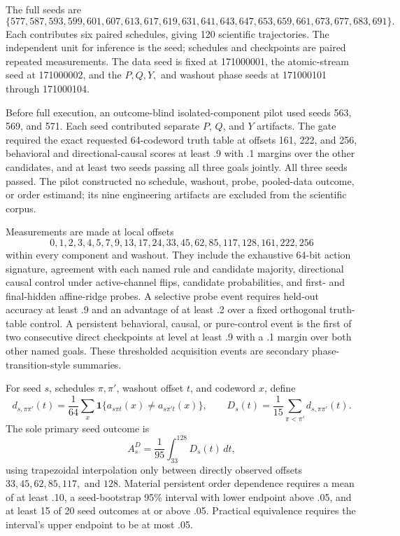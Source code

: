 \documentclass[11pt,a4paper]{article}
\begin{document}
The full seeds are
\[
\{577,587,593,599,601,607,613,617,619,631,
641,643,647,653,659,661,673,677,683,691\}.
\]
Each contributes six paired schedules, giving 120 scientific trajectories. The independent unit for inference is the seed; schedules and checkpoints are paired repeated measurements. The data seed is fixed at 171000001, the atomic-stream seed at 171000002, and the $P,Q,Y,$ and washout phase seeds at 171000101 through 171000104.

Before full execution, an outcome-blind isolated-component pilot used seeds 563, 569, and 571. Each seed contributed separate $P$, $Q$, and $Y$ artifacts. The gate required the exact requested 64-codeword truth table at offsets 161, 222, and 256, behavioral and directional-causal scores at least .9 with .1 margins over the other candidates, and at least two seeds passing all three goals jointly. All three seeds passed. The pilot constructed no schedule, washout, probe, pooled-data outcome, or order estimand; its nine engineering artifacts are excluded from the scientific corpus.

Measurements are made at local offsets
\[
0,1,2,3,4,5,7,9,13,17,24,33,45,62,85,117,128,161,222,256
\]
within every component and washout. They include the exhaustive 64-bit action signature, agreement with each named rule and candidate majority, directional causal control under active-channel flips, candidate probabilities, and first- and final-hidden affine-ridge probes. A selective probe event requires held-out accuracy at least .9 and an advantage of at least .2 over a fixed orthogonal truth-table control. A persistent behavioral, causal, or pure-control event is the first of two consecutive direct checkpoints at level at least .9 with a .1 margin over both other named goals. These thresholded acquisition events are secondary phase-transition-style summaries.

For seed $s$, schedules $\pi,\pi'$, washout offset $t$, and codeword $x$, define
\[
d_{s,\pi\pi'}(t)
=\frac1{64}\sum_x
\mathbf 1\{a_{s\pi t}(x)\ne a_{s\pi't}(x)\},
\qquad
D_s(t)=\frac1{15}\sum_{\pi<\pi'}d_{s,\pi\pi'}(t).
\]
The sole primary seed outcome is
\[
A^D_s=\frac1{95}\int_{33}^{128}D_s(t)\,dt,
\]
using trapezoidal interpolation only between directly observed offsets $33,45,62,85,117,$ and $128$. Material persistent order dependence requires a mean of at least .10, a seed-bootstrap 95\% interval with lower endpoint above .05, and at least 15 of 20 seed outcomes at or above .05. Practical equivalence requires the interval's upper endpoint to be at most .05.
\end{document}
